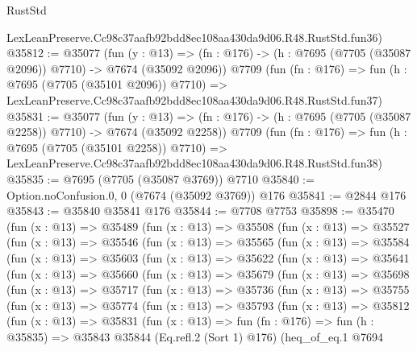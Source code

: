 \begin{lexlean}{RustStd}
\begin{coremodule}
    LexLeanPreserve.Cc98c37aafb92bdd8ec108aa430da9d06.R48.RustStd.fun36)
@35812 := @35077
    (fun (y : @13) =>
    (fn : @176) -> (h : @7695 (@7705 (@35087 @2096)) @7710) -> @7674 (@35092 @2096))
    @7709
    (fun (fn : @176) =>
    fun (h : @7695 (@7705 (@35101 @2096)) @7710) =>
    LexLeanPreserve.Cc98c37aafb92bdd8ec108aa430da9d06.R48.RustStd.fun37)
@35831 := @35077
    (fun (y : @13) =>
    (fn : @176) -> (h : @7695 (@7705 (@35087 @2258)) @7710) -> @7674 (@35092 @2258))
    @7709
    (fun (fn : @176) =>
    fun (h : @7695 (@7705 (@35101 @2258)) @7710) =>
    LexLeanPreserve.Cc98c37aafb92bdd8ec108aa430da9d06.R48.RustStd.fun38)
@35835 := @7695 (@7705 (@35087 @3769)) @7710
@35840 := Option.noConfusion.{0, 0} (@7674 (@35092 @3769)) @176
@35841 := @2844 @176
@35843 := @35840 @35841 @176
@35844 := @7708 @7753
@35898 := @35470
    (fun (x : @13) =>
    @35489
      (fun (x : @13) =>
      @35508
        (fun (x : @13) =>
        @35527
          (fun (x : @13) =>
          @35546
            (fun (x : @13) =>
            @35565
              (fun (x : @13) =>
              @35584
                (fun (x : @13) =>
                @35603
                  (fun (x : @13) =>
                  @35622
                    (fun (x : @13) =>
                    @35641
                      (fun (x : @13) =>
                      @35660
                        (fun (x : @13) =>
                        @35679
                          (fun (x : @13) =>
                          @35698
                            (fun (x : @13) =>
                            @35717
                              (fun (x : @13) =>
                              @35736
                                (fun (x : @13) =>
                                @35755
                                  (fun (x : @13) =>
                                  @35774
                                    (fun (x : @13) =>
                                    @35793
                                      (fun (x : @13) =>
                                      @35812
                                        (fun (x : @13) =>
                                        @35831
                                          (fun (x : @13) =>
                                          fun (fn : @176) =>
                                          fun (h : @35835) =>
                                          @35843
                                            @35844
                                            (Eq.refl.{2} (Sort 1) @176)
                                            (heq_of_eq.{1}
                                              @7694

\end{coremodule}
\end{lexlean}
